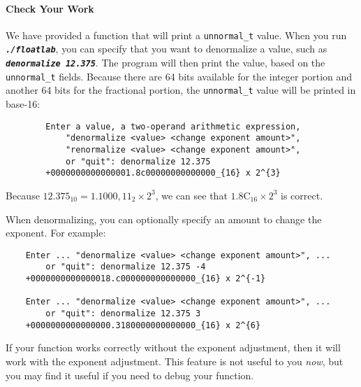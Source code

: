 \paragraph*{Check Your Work}

We have provided a function that will print a \lstinline{unnormal_t} value.
When you run \texttt{\textbf{\textit{./floatlab}}}, you can specify that you want to denormalize a value, such as \texttt{\textbf{\textit{denormalize 12.375}}}.
The program will then print the value, based on the \lstinline{unnormal_t} fields.
Because there are 64 bits available for the integer portion and another 64 bits for the fractional portion, the \lstinline{unnormal_t} value will be printed in base-16:

\begin{verbatim}
        Enter a value, a two-operand arithmetic expression,
            "denormalize <value> <change exponent amount>",
            "renormalize <value> <change exponent amount>",
            or "quit": denormalize 12.375
        +0000000000000001.8c00000000000000_{16} x 2^{3}
\end{verbatim}

Because $12.375_{10} = 1.1000,11_{2} \times 2^3$, we can see that $1.8\mathrm{C}_{16} \times 2^3$ is correct.

When denormalizing, you can optionally specify an amount to change the exponent.
For example:

\begin{verbatim}
    Enter ... "denormalize <value> <change exponent amount>", ...
        or "quit": denormalize 12.375 -4
    +0000000000000018.c000000000000000_{16} x 2^{-1}

    Enter ... "denormalize <value> <change exponent amount>", ...
        or "quit": denormalize 12.375 3
    +0000000000000000.3180000000000000_{16} x 2^{6}
\end{verbatim}

If your  function works correctly without the exponent adjustment, then it will work with the exponent adjustment.
This feature is not useful to you \textit{now}, but you may find it useful if you need to debug your  function.
